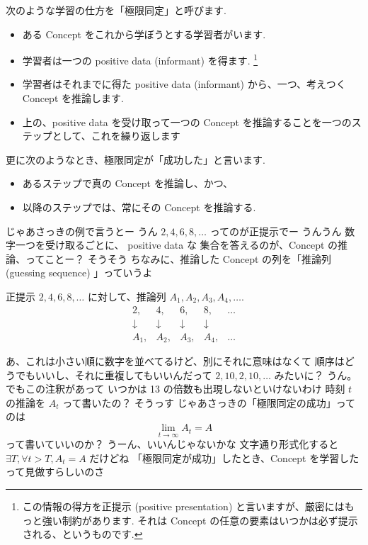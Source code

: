 \begin{boxnote}
    次のような学習の仕方を「極限同定」と呼びます.
    \begin{itemize}
        \setlength{\itemsep}{-1mm}
        \item
            ある Concept をこれから学ぼうとする学習者がいます.
        \item
            学習者は一つの positive data (informant) を得ます. \footnote{この情報の得方を正提示 (positive presentation) と言いますが、厳密にはもっと強い制約があります. それは Concept の任意の要素はいつかは必ず提示される、というものです.}
        \item
            学習者はそれまでに得た positive data (informant) から、一つ、考えつく Concept を推論します.
        \item
            上の、positive data を受け取って一つの Concept を推論することを一つのステップとして、これを繰り返します
    \end{itemize}

    更に次のようなとき、極限同定が「成功した」と言います.
    \begin{itemize}
        \setlength{\itemsep}{-1mm}
        \item
            あるステップで真の Concept を推論し、かつ、
        \item
            以降のステップでは、常にその Concept を推論する.
    \end{itemize}
\end{boxnote}

\YUKARI じゃあさっきの例で言うとー
\YUI うん
\YUKARI $2, 4, 6, 8, \ldots$ ってのが正提示でー
\YUI うんうん
\YUKARI 数字一つを受け取るごとに、
\YUI positive data な
\YUKARI 集合を答えるのが、Concept の推論、ってことー？
\YUZUKO そうそう
\YUZUKO ちなみに、推論した Concept の列を「推論列 (guessing sequence) 」っていうよ

\begin{boxnote}
    正提示 $2, 4, 6, 8, \ldots$ に対して、推論列 $A_1, A_2, A_3, A_4, \ldots$.
\[
    \begin{array}{ccccc}
        2, & 4, & 6, & 8, & \ldots \\
        \downarrow & \downarrow & \downarrow & \downarrow & \\
        A_1, & A_2, & A_3, & A_4, & \ldots
    \end{array}
\]
\end{boxnote}

\YUZUKO あ、これは小さい順に数字を並べてるけど、別にそれに意味はなくて
\YUZUKO 順序はどうでもいいし、それに重複してもいいんだって
\YUKARI $2, 10, 2, 10, \ldots$ みたいに？
\YUZUKO うん。でもこの注釈があって
\YUZUKO いつかは 13 の倍数も出現しないといけないわけ
\YUI 時刻 $t$ の推論を $A_t$ って書いたの？
\YUZUKO そうっす
\YUI じゃあさっきの「極限同定の成功」ってのは
$$\lim_{t \rightarrow \infty} A_t = A$$
\YUI って書いていいのか？
\YUZUKO うーん、いいんじゃないかな
\YUZUKO 文字通り形式化すると $\exists T, \forall t > T, A_t = A$ だけどね
\YUZUKO 「極限同定が成功」したとき、Concept を学習したって見做すらしいのさ

